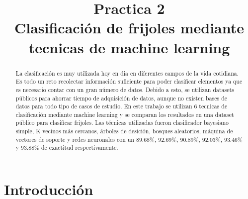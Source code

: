 \documentclass[conference]{IEEEtran}
\begin{document}
\title{Practica 2 \\ Clasificación de frijoles mediante tecnicas de machine learning}

\author{
}

\maketitle

\begin{abstract}
La clasificación es muy utilizada hoy en dia en diferentes campos de la vida cotidiana. Es todo un reto recolectar información suficiente para poder clasificar elementos ya que es necesario contar con un gran número de datos. Debido a esto, se utilizan datasets públicos para ahorrar tiempo de adquisición de datos, aunque no existen bases de datos para todo tipo de casos de estudio. En este trabajo se utilizan 6 tecnicas de clasificación mediante machine learning y se comparan los resultados en una dataset público para clasificar frijoles. Las técnicas utilizadas fueron clasificador bayesiano simple, K vecinos más cercanos, árboles de desición, bosques aleatorios, máquina de vectores de soporte y redes neuronales con un 89.68\%, 92.69\%, 90.89\%, 92.03\%, 93.46\% y 93.88\% de exactitud respectivamente.       
\end{abstract}

\section{Introducción}
\end{document}
